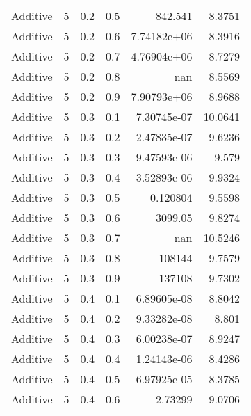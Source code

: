 \documentclass{article}
\begin{document}
\begin{longtable}[H]{lrrrrr}
 Additive       &       5 &   0.2 &            0.5 &    842.541       &          8.3751 \\
 Additive       &       5 &   0.2 &            0.6 &      7.74182e+06 &          8.3916 \\
 Additive       &       5 &   0.2 &            0.7 &      4.76904e+06 &          8.7279 \\
 Additive       &       5 &   0.2 &            0.8 &    nan           &          8.5569 \\
 Additive       &       5 &   0.2 &            0.9 &      7.90793e+06 &          8.9688 \\
 Additive       &       5 &   0.3 &            0.1 &      7.30745e-07 &         10.0641 \\
 Additive       &       5 &   0.3 &            0.2 &      2.47835e-07 &          9.6236 \\
 Additive       &       5 &   0.3 &            0.3 &      9.47593e-06 &          9.579  \\
 Additive       &       5 &   0.3 &            0.4 &      3.52893e-06 &          9.9324 \\
 Additive       &       5 &   0.3 &            0.5 &      0.120804    &          9.5598 \\
 Additive       &       5 &   0.3 &            0.6 &   3099.05        &          9.8274 \\
 Additive       &       5 &   0.3 &            0.7 &    nan           &         10.5246 \\
 Additive       &       5 &   0.3 &            0.8 & 108144           &          9.7579 \\
 Additive       &       5 &   0.3 &            0.9 & 137108           &          9.7302 \\
 Additive       &       5 &   0.4 &            0.1 &      6.89605e-08 &          8.8042 \\
 Additive       &       5 &   0.4 &            0.2 &      9.33282e-08 &          8.801  \\
 Additive       &       5 &   0.4 &            0.3 &      6.00238e-07 &          8.9247 \\
 Additive       &       5 &   0.4 &            0.4 &      1.24143e-06 &          8.4286 \\
 Additive       &       5 &   0.4 &            0.5 &      6.97925e-05 &          8.3785 \\
 Additive       &       5 &   0.4 &            0.6 &      2.73299     &          9.0706 \\

\end{longtable}
\end{document}
